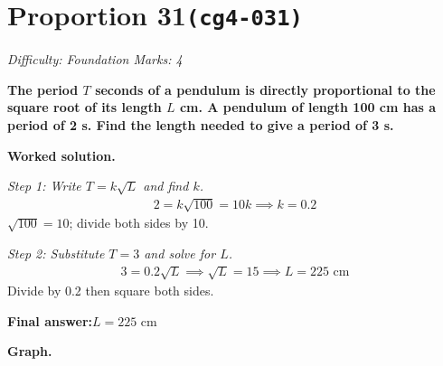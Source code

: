 \documentclass[11pt]{article}
\newcommand{\question}[1]{\par\medskip\noindent\textbf{#1}\par}
\begin{document}
\section*{Proportion 31\quad\small\texttt{(cg4-031)}}
\textit{Difficulty: Foundation \quad\textbar\quad Marks: 4}

\question{The period \( T \) seconds of a pendulum is directly proportional to the square root of its length \( L \) cm. A pendulum of length 100 cm has a period of 2 s. Find the length needed to give a period of 3 s.}

\textbf{Worked solution.}

\textit{Step 1: Write \( T = k\sqrt{L} \) and find \( k \).}
\[\begin{gathered}
2 = k\sqrt{100} = 10k \implies k = 0.2
\end{gathered}\]
\( \sqrt{100} = 10 \); divide both sides by 10.

\textit{Step 2: Substitute \( T = 3 \) and solve for \( L \).}
\[\begin{gathered}
3 = 0.2\sqrt{L} \implies \sqrt{L} = 15 \implies L = 225 \text{ cm}
\end{gathered}\]
Divide by 0.2 then square both sides.

\begin{answerbox}
\textbf{Final answer:}\quad \(\displaystyle  L = 225 \) cm
\end{answerbox}
\textbf{Graph.}
\end{document}
